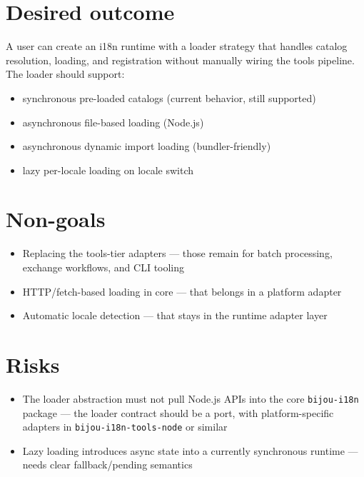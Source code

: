 \section{Desired outcome}\label{record-357-desired-outcome}

A user can create an i18n runtime with a loader strategy that handles catalog resolution, loading, and registration without manually wiring the tools pipeline. The loader should support:

\begin{itemize}
\tightlist
\item
  synchronous pre-loaded catalogs (current behavior, still supported)
\item
  asynchronous file-based loading (Node.js)
\item
  asynchronous dynamic import loading (bundler-friendly)
\item
  lazy per-locale loading on locale switch
\end{itemize}

\section{Non-goals}\label{record-357-non-goals}

\begin{itemize}
\tightlist
\item
  Replacing the tools-tier adapters --- those remain for batch processing, exchange workflows, and CLI tooling
\item
  HTTP/fetch-based loading in core --- that belongs in a platform adapter
\item
  Automatic locale detection --- that stays in the runtime adapter layer
\end{itemize}

\section{Risks}\label{record-357-risks}

\begin{itemize}
\tightlist
\item
  The loader abstraction must not pull Node.js APIs into the core \texttt{b\allowbreak{}i\allowbreak{}j\allowbreak{}o\allowbreak{}u\allowbreak{}-\allowbreak{}i\allowbreak{}1\allowbreak{}8\allowbreak{}n} package --- the loader contract should be a port, with platform-specific adapters in \texttt{b\allowbreak{}i\allowbreak{}j\allowbreak{}o\allowbreak{}u\allowbreak{}-\allowbreak{}i\allowbreak{}1\allowbreak{}8\allowbreak{}n\allowbreak{}-\allowbreak{}t\allowbreak{}o\allowbreak{}o\allowbreak{}l\allowbreak{}s\allowbreak{}-\allowbreak{}n\allowbreak{}o\allowbreak{}d\allowbreak{}e} or similar
\item
  Lazy loading introduces async state into a currently synchronous runtime --- needs clear fallback/pending semantics
\end{itemize}

